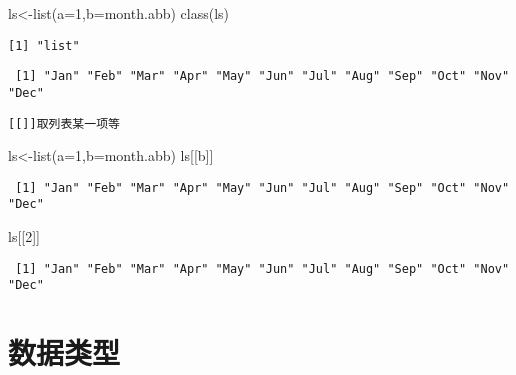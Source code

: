 \documentclass[
  letterpaper,
  DIV=11,
  numbers=noendperiod]{scrreprt}
\newenvironment{Shaded}{\begin{snugshade}}{\end{snugshade}}
\newcommand{\AttributeTok}[1]{\textcolor[rgb]{0.40,0.45,0.13}{#1}}
\newcommand{\DecValTok}[1]{\textcolor[rgb]{0.68,0.00,0.00}{#1}}
\newcommand{\FunctionTok}[1]{\textcolor[rgb]{0.28,0.35,0.67}{#1}}
\newcommand{\NormalTok}[1]{\textcolor[rgb]{0.00,0.23,0.31}{#1}}
\newcommand{\OtherTok}[1]{\textcolor[rgb]{0.00,0.23,0.31}{#1}}
\newcommand{\SpecialCharTok}[1]{\textcolor[rgb]{0.37,0.37,0.37}{#1}}
\begin{document}
\begin{Shaded}
\begin{Highlighting}[]
\NormalTok{ls}\OtherTok{\textless{}{-}}\FunctionTok{list}\NormalTok{(}\AttributeTok{a=}\DecValTok{1}\NormalTok{,}\AttributeTok{b=}\NormalTok{month.abb)}
\FunctionTok{class}\NormalTok{(ls)}
\end{Highlighting}
\end{Shaded}

\begin{verbatim}
[1] "list"
\end{verbatim}

\begin{Shaded}
\end{Shaded}

\begin{verbatim}
 [1] "Jan" "Feb" "Mar" "Apr" "May" "Jun" "Jul" "Aug" "Sep" "Oct" "Nov" "Dec"
\end{verbatim}

\texttt{{[}{[}{]}{]}取列表某一项等}

\begin{Shaded}
\begin{Highlighting}[]
\NormalTok{ls}\OtherTok{\textless{}{-}}\FunctionTok{list}\NormalTok{(}\AttributeTok{a=}\DecValTok{1}\NormalTok{,}\AttributeTok{b=}\NormalTok{month.abb)}
\NormalTok{ls[[b]]}
\end{Highlighting}
\end{Shaded}

\begin{verbatim}
 [1] "Jan" "Feb" "Mar" "Apr" "May" "Jun" "Jul" "Aug" "Sep" "Oct" "Nov" "Dec"
\end{verbatim}

\begin{Shaded}
\begin{Highlighting}[]
\NormalTok{ls[[}\DecValTok{2}\NormalTok{]]}
\end{Highlighting}
\end{Shaded}

\begin{verbatim}
 [1] "Jan" "Feb" "Mar" "Apr" "May" "Jun" "Jul" "Aug" "Sep" "Oct" "Nov" "Dec"
\end{verbatim}

\chapter{数据类型}\label{ux6570ux636eux7c7bux578b}
\end{document}
